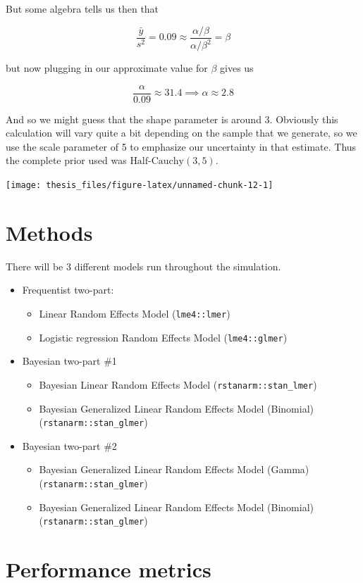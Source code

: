 \documentclass[12pt,twoside]{reedthesis}
\providecommand{\tightlist}{%
  \setlength{\itemsep}{0pt}\setlength{\parskip}{0pt}}
\begin{document}
But some algebra tells us then that

\[
\frac{\bar{y}}{s^2} = 0.09 \approx \frac{\alpha / \beta}{\alpha / \beta^2} = \beta 
\]

but now plugging in our approximate value for \(\beta\) gives us

\[
\frac{\alpha}{0.09} \approx 31.4 \implies \alpha \approx 2.8
\]

And so we might guess that the shape parameter is around 3. Obviously this calculation will vary quite a bit depending on the sample that we generate, so we use the scale parameter of 5 to emphasize our uncertainty in that estimate. Thus the complete prior used was \(\text{Half-Cauchy}(3, 5)\).
\begin{center}\texttt{[image: thesis\_files/figure-latex/unnamed-chunk-12-1]} \end{center}

\hypertarget{methods}{%
\section{Methods}\label{methods}}

There will be 3 different models run throughout the simulation.
\begin{itemize}
\tightlist
\item
  Frequentist two-part:
  \begin{itemize}
  \tightlist
  \item
    Linear Random Effects Model (\texttt{lme4::lmer})
  \item
    Logistic regression Random Effects Model (\texttt{lme4::glmer})
  \end{itemize}
\item
  Bayesian two-part \#1
  \begin{itemize}
  \tightlist
  \item
    Bayesian Linear Random Effects Model (\texttt{rstanarm::stan\_lmer})
  \item
    Bayesian Generalized Linear Random Effects Model (Binomial) (\texttt{rstanarm::stan\_glmer})
  \end{itemize}
\item
  Bayesian two-part \#2
  \begin{itemize}
  \tightlist
  \item
    Bayesian Generalized Linear Random Effects Model (Gamma) (\texttt{rstanarm::stan\_glmer})
  \item
    Bayesian Generalized Linear Random Effects Model (Binomial) (\texttt{rstanarm::stan\_glmer})
  \end{itemize}
\end{itemize}
\hypertarget{metrics}{%
\section{Performance metrics}\label{metrics}}
\end{document}
